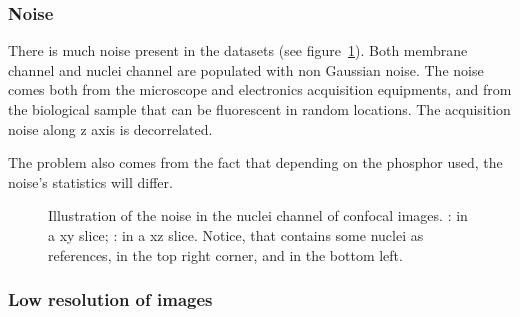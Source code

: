 
\subsubsection{Noise}
There is much noise present in the datasets (see figure~\ref{fig:noiseNuc}). Both membrane channel and nuclei channel are populated with non Gaussian noise.
The noise comes both from the microscope and electronics acquisition equipments, and from the biological sample that can be fluorescent in random locations.
The acquisition noise along z axis is decorrelated.

The problem also comes from the fact that depending on the phosphor used, the noise's statistics will differ.
\begin{figure}[htb]
\centering
   \hspace{5pt}
  \caption{%
    Illustration of the noise in the nuclei channel of confocal images.
    : in a xy slice;
    : in a xz slice. 
    Notice, that  contains some nuclei as references, in the top right corner, and  in the bottom left.}
\label{fig:noiseNuc}
\end{figure}




\subsubsection{Low resolution of images}

